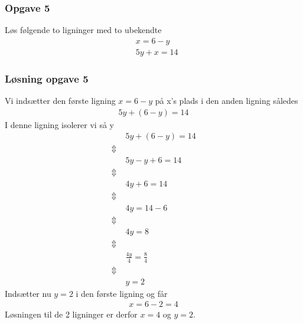 \subsubsection{Opgave 5}

Løs følgende to ligninger med to ubekendte
\begin{align*}
   &x = 6 - y\\
    &5y + x = 14
\end{align*}

\subsubsection*{Løsning opgave 5}

Vi indsætter den første ligning $x = 6-y$ på x's plads i den anden ligning således
\begin{align*}
    5y + (6 - y) = 14
\end{align*}
I denne ligning isolerer vi så y
\begin{align*}
    &5y + (6 - y) = 14\\
    \Updownarrow \; &\\
    &5y - y + 6 = 14\\
    \Updownarrow \; &\\
    &4y + 6 = 14\\
    \Updownarrow \; &\\
    &4y = 14 - 6\\
    \Updownarrow \; &\\
    &4y = 8\\
    \Updownarrow \; &\\
    &\frac{4y}{4} = \frac{8}{4}\\
    \Updownarrow \; &\\
    &y = 2
\end{align*}
Indsætter nu $y = 2$ i den første ligning og får
\begin{align*}
    x = 6 - 2 = 4
\end{align*}
Løsningen til de 2 ligninger er derfor $x = 4$ og $y = 2$. 